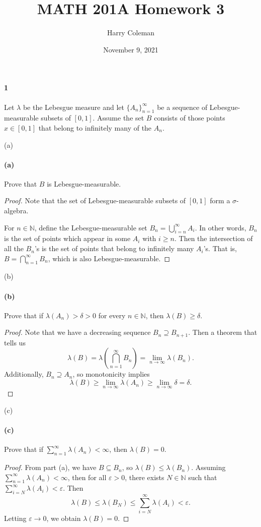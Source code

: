\documentclass[12pt]{article}
\renewcommand{\maketitle}{\thispagestyle{title}}
\newlength{\myparskip}
\newenvironment{fullbox}{\begin{lrbox}{\savefullbox}\begin{minipage}{\dimexpr\textwidth-2\fboxsep\relax}\setlength{\parskip}{\myparskip}}{\end{minipage}\end{lrbox}\framebox[\textwidth]{\usebox{\savefullbox}}}
\newenvironment{pbox}[1][]{\begin{fullbox}\ifx#1\empty\else\paragraph{#1}\fi}{\end{fullbox}}
\newcommand{\N}{\mathbb{N}}
\newcommand{\eps}{\varepsilon}
\newcommand{\<}{\langle}
\renewcommand{\>}{\rangle}
\begin{document}
\title{MATH 201A Homework 3}
\author{Harry Coleman}
\date{November 9, 2021}
\maketitle

\begin{pbox}[1]
    Let $\lambda$ be the Lebesgue measure and let $\{A_n\}_{n=1}^{\infty}$ be a sequence of Lebesgue-measurable subsets of $[0, 1]$. Assume the set $B$ consists of those points $x \in [0, 1]$ that belong to infinitely many of the $A_n$.
\end{pbox}

\begin{pbox}[(a)]
    Prove that $B$ is Lebesgue-measurable.
\end{pbox}

\begin{proof}
    Note that the set of Lebesgue-measurable subsets of $[0, 1]$ form a $\sigma$-algebra.

    For $n \in \N$, define the Lebesgue-measurable set $B_n = \bigcup_{i=n}^{\infty} A_i$. In other words, $B_n$ is the set of points which appear in some $A_i$ with $i \geq n$. Then the intersection of all the $B_n$'s is the set of points that belong to infinitely many $A_i$'s. That is, $B = \bigcap_{n=1}^{\infty} B_n$, which is also Lebesgue-measurable.
\end{proof}

\begin{pbox}[(b)]
    Prove that if $\lambda(A_n) > \delta > 0$ for every $n \in \N$, then $\lambda(B) \geq \delta$.
\end{pbox}

\begin{proof}
    Note that we have a decreasing sequence $B_n \supseteq B_{n+1}$. Then a theorem that tells us
    \[
        \lambda(B)
            = \lambda\left(\bigcap_{n=1}^{\infty} B_n\right)
            = \lim_{n \to \infty} \lambda(B_n).
    \]
    Additionally, $B_n \supseteq A_n$, so monotonicity implies
    \[
        \lambda(B)
            \geq \lim_{n \to \infty} \lambda(A_n)
            \geq \lim_{n \to \infty} \delta
            = \delta.
    \]
\end{proof}

\begin{pbox}[(c)]
    Prove that if $\sum_{n=1}^{\infty} \lambda(A_n) < \infty$, then $\lambda(B) = 0$.
\end{pbox}

\begin{proof}
    From part (a), we have $B \subseteq B_n$, so $\lambda(B) \leq \lambda(B_n)$. Assuming $\sum_{n=1}^{\infty} \lambda(A_n) < \infty$, then for all $\eps > 0$, there exists $N \in \N$ such that $\sum_{i=N}^{\infty} \lambda(A_i) < \eps$. Then
    \[
        \lambda(B)
            \leq \lambda(B_N)
            \leq \sum_{i=N}^{\infty} \lambda(A_i)
            < \eps.
    \]
    Letting $\eps \to 0$, we obtain $\lambda(B) = 0$.
\end{proof}
\end{document}
